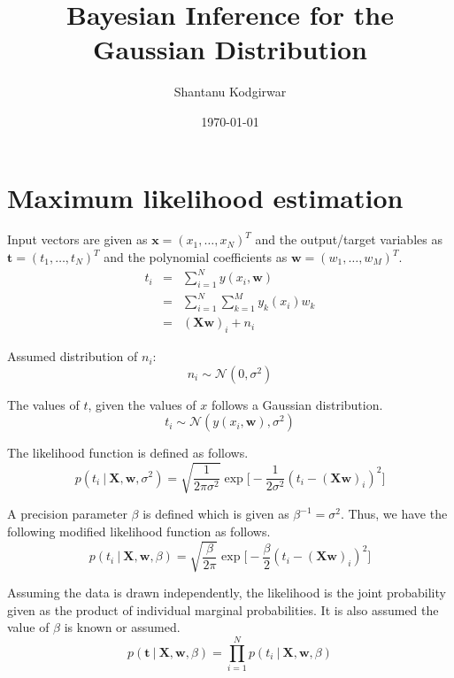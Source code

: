 \documentclass[11pt]{article}
\title{Bayesian Inference for the Gaussian Distribution}
\date{\today}
\author{Shantanu Kodgirwar}
\newcommand\given[1][]{\:#1\vert\:}
\begin{document}
\maketitle

\section{Maximum likelihood estimation}

Input vectors are given as $\bm{x} = (x_1, \ldots, x_N)^T$ and the output/target variables as $\bm{t} = (t_1, \ldots, t_N)^T$ and the polynomial coefficients as $\bm{w} = (w_1, \ldots, w_M)^T$.
\begin{eqnarray}
        t_{i}
        &=& \sum_{i=1}^N y(x_i, \bm{w})\\
        &=&
        \sum_{i=1}^N \sum_{k=1}^M y_k(x_i)w_k\\
        &=&
        (\bm{X}\bm{w})_i + n_i
\end{eqnarray}

Assumed distribution of $n_i$:
\begin{equation}\label{eqn:model}
n_i \sim \mathcal{N}(0, \sigma^2)
\end{equation}

The values of $t$, given the values of $x$ follows a Gaussian distribution.
\begin{equation}
    t_i \sim \mathcal{N}(y(x_i, \bm{w}), \sigma^2)
\end{equation}

The likelihood function is defined as follows.
\begin{equation}
    p(t_i \given \bm{X}, \bm{w}, \sigma^2) = \sqrt{\frac{1}{2\pi\sigma^2}}\exp{\Big[-\frac{1}{2\sigma^2} \left(t_i - (\bm{X}\bm{w})_i\right)^2\Big]}
\end{equation}

A precision parameter $\beta$ is defined which is given as $\beta^{-1} = \sigma^2$. 
Thus, we have the following modified likelihood function as follows.
\begin{equation}
    p(t_i \given \bm{X}, \bm{w}, \beta) = \sqrt{\frac{\beta}{2\pi}}\exp{\Big[-\frac{\beta}{2} \left(t_i - (\bm{X}\bm{w})_i\right)^2\Big]}
\end{equation}

Assuming the data is drawn independently, the likelihood is the joint probability given as the product of individual marginal probabilities. It is also assumed the value of $\beta$ is known or assumed. 
\begin{equation}\label{eqn:likelihood}
    p(\bm{t} \given \bm{X}, \bm{w}, \beta) = \prod_{i=1}^N p(t_i \given \bm{X}, \bm{w}, \beta)
\end{equation}
\end{document}
